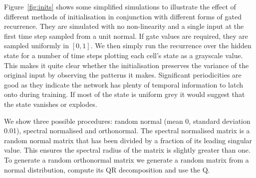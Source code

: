 Figure~\ref{fig:inits} shows some simplified simulations to illustrate the effect of
different methods of initialisation in conjunction with different forms of gated recurrence. They are
simulated with no non-linearity and a single input at the first time step sampled from a unit
normal. If gate values are required, they are sampled uniformly in \([0,1]\). We then simply
run the recurrence over the hidden state for a number of time steps plotting each cell's state
as a grayscale value. This makes it quite clear whether the initialisation preserves the variance
of the original input by observing the patterns it makes. Significant periodicities are
good as they indicate the network has plenty of temporal information to latch onto during
training. If most of the state is uniform grey it would suggest that the state vanishes
or explodes.

We show three possible procedures: random normal (mean 0, standard deviation 0.01), spectral
normalised and orthonormal. The spectral normalised matrix is a random normal matrix that
has been divided by a fraction of its leading singular value. This ensures the spectral
radius of the matrix is slightly greater than one. To generate a random orthonormal matrix
we generate a random matrix from a normal distribution, compute its QR decomposition and use the
Q.


